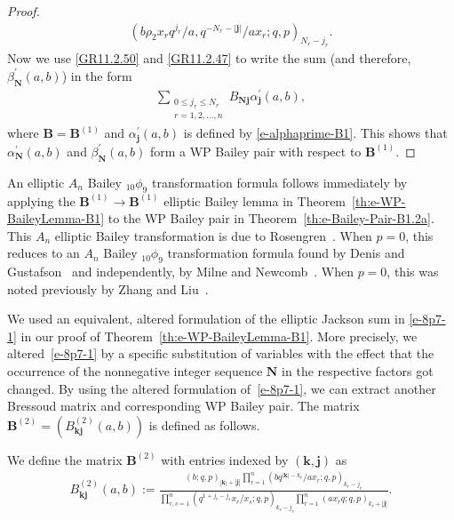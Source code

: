 \documentclass[pdftex]{sigma}
\numberwithin{equation}{section}
\newcommand\sumj{{\left| \boldsymbol {j} \right|}}
\newcommand\sumk{{\left| \boldsymbol{k} \right|}}
\newcommand{\B}{{ \mathbf B}}
\newcommand{\N}{{ \boldsymbol N}}
\renewcommand{\k}{{ \boldsymbol{k}}}
\renewcommand{\j}{{ \boldsymbol{j}}}
\newcommand{\multsum}[3]{{\sum\limits_{\substack{{0\le #1_#3 \le #2_#3} \\
{#3 =1,2,\dots, n}}}}}
\newcommand{\sqprod}[1]{\prod\limits_{r, s =1}^{#1}} %
\newcommand{\smallprod}[1]{\prod\limits_{r =1}^{#1}} %
\newcommand{\xover}[1]{#1_{r}/#1_{s}}
\newcommand{\ellipticqrfac}[2]{{\left({#1}; q, p\right)_{#2}}} %
\begin{document}
\begin{proof}
\begin{gather*}
{\ellipticqrfac{b\rho_2x_rq^{j_r}/a, q^{-N_r-\sumj}/ax_r}{N_r-j_r}}.
\end{gather*}
Now we use \eqref{GR11.2.50} and \eqref{GR11.2.47} to write the sum (and therefore, $\beta_\N^{\prime}(a,b)$) in the form
\begin{gather*}\label{BP-prime}
\multsum{j}{N}{r} B_{\N\j} \alpha^{\prime}_\j (a,b),
\end{gather*}
where $\B= \B^{(1)}$ and $\alpha^{\prime}_\j (a,b)$ is defined by \eqref{e-alphaprime-B1}. This shows that ${\alpha}^{\prime}_\N(a,b)$ and ${\beta}^{\prime}_\N(a,b)$ form a WP Bailey pair with respect to $\B^{(1)}$.
\end{proof}

\begin{Remark}\label{rem:B1-B1-10p9} An elliptic $A_n$ Bailey $_{10}\phi_9$ transformation formula follows immediately by applying the $\B^{(1)}\to\B^{(1)}$ elliptic Bailey lemma in Theorem~\ref{th:e-WP-BaileyLemma-B1} to the WP Bailey pair in Theorem~\ref{th:e-Bailey-Pair-B1.2a}. This $A_n$ elliptic Bailey transformation is due to Rosengren~\cite[Corollary~8.1]{HR2004}. When $p=0$, this reduces to an $A_n$ Bailey $_{10}\phi_9$ transformation formula found by Denis and Gustafson~\cite{DG1992} and independently, by Milne and Newcomb~\cite[Theorem~3.1]{MN1996}. When $p=0$, this was noted previously by Zhang and Liu~\cite{ZL2016}.
\end{Remark}

We used an equivalent, altered formulation of the elliptic Jackson sum in \eqref{e-8p7-1} in our proof of Theorem~\ref{th:e-WP-BaileyLemma-B1}. More precisely, we altered~\eqref{e-8p7-1} by a specific substitution of variables with the effect that the occurrence of the nonnegative integer sequence $\N$ in the respective factors got changed. By using the altered formulation of~\eqref{e-8p7-1}, we can extract another Bressoud matrix and corresponding WP Bailey pair. The matrix $\B^{(2)}= (B^{(2)}_{\k\j}(a,b))$ is defined as follows.
\begin{Definition} We define the matrix $\B^{(2)}$ with entries indexed by $(\k , \j)$ as
\begin{gather}
B^{(2)}_{\k \j}(a,b) := \frac{\ellipticqrfac{b}{\sumk+\sumj} \smallprod n \ellipticqrfac{bq^{\sumk-k_r}/ax_r}{k_r-j_r}}
{\sqprod n \ellipticqrfac{q^{1+j_r-j_s}\xover x }{k_r-j_r} \smallprod n \ellipticqrfac{ax_rq}{k_r+\sumj}}. \label{e-B2}
\end{gather}
\end{Definition}
\end{document}
